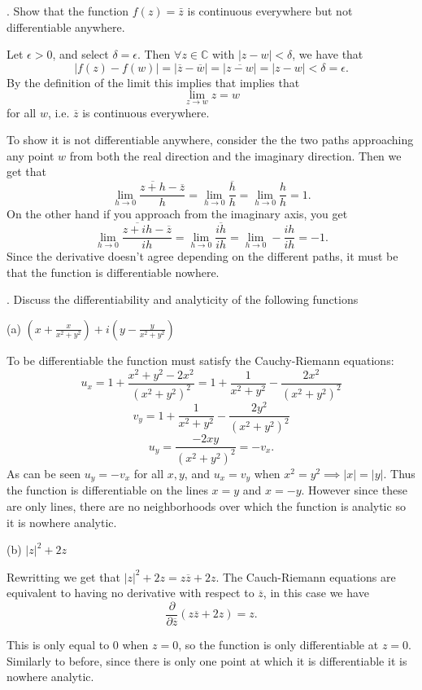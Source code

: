 \documentclass[letterpaper, reqno,11pt]{article}
\begin{document}
\medskip

. Show that the function $ f(z)= \bar{z}$ is continuous everywhere but not differentiable anywhere.

\medskip

Let $\epsilon>0$, and select $\delta=\epsilon$. Then $\forall z\in\mathbb{C}$ with $|z-w|<\delta$, we have that
\[
|f(z)-f(w)|=|\overline{z}-\overline{w}|=|\overline{z-w}|=|z-w|<\delta=\epsilon
.\]
By the definition of the limit this implies that  implies that  
\[
\lim_{z\to w}z=w
\]
for all $w$, i.e. $\overline{z}$ is continuous everywhere. 

To show it is not differentiable anywhere, consider the the two paths approaching any point $w$ from both the real direction and the imaginary direction. Then we get that 
\[
    \lim_{h \to 0} \frac{\overline{z+h}-\overline{z}}{h}=\lim_{h \to 0}\frac{\overline{h}}{h}=\lim_{h \to 0}\frac{h}{h}=1
.\]
On the other hand if you approach from the imaginary axis, you get
\[
\lim_{h \to 0} \frac{\overline{z+ih}-\overline{z}}{ih}=\lim_{h \to 0}\frac{\overline{ih}}{ih}=\lim_{h \to 0}-\frac{ih}{ih}=-1
.\]
Since the derivative doesn't agree depending on the different paths, it must be that the function is differentiable nowhere. 

\medskip

. Discuss the differentiability and analyticity of the following functions

(a) $(x+\frac{x}{x^2+y^2})+ i (y-\frac{y}{x^2+y^2})$

To be differentiable the function must satisfy the Cauchy-Riemann equations: 
\[
u_x=1+\frac{x^2+y^2-2x^2}{(x^2+y^2)^2}=1+\frac{1}{x^2+y^2}-\frac{2x^2}{(x^2+y^2)^2}
\]
\[
v_y=1+\frac{1}{x^2+y^2}-\frac{2y^2}{(x^2+y^2)^2}
\]
\[
u_y=\frac{-2xy}{(x^2+y^2)^2}=-v_x
.\]
As can be seen $u_y=-v_x$ for all $x, y$, and $u_x=v_y$ when $x^2=y^2\implies |x|=|y|$. Thus the function is differentiable on the lines $x=y$ and $x=-y$. However since these are only lines, there are no neighborhoods over which the function is  analytic so it is nowhere analytic. 

(b) $ |z|^2+ 2z$

Rewritting we get that $|z|^2+2z=z\overline{z}+2z$. The Cauch-Riemann equations are equivalent to having no derivative with respect to $\overline{z}$, in this case we have 
\[
    \frac{\partial }{\partial \overline{z}} \left( z\overline{z}+2z \right) =z
.\]

This is only equal to 0 when $z=0$, so the function is only differentiable at $z=0$. Similarly to before, since there is only one point at which it is differentiable it is nowhere analytic. 
\end{document}
